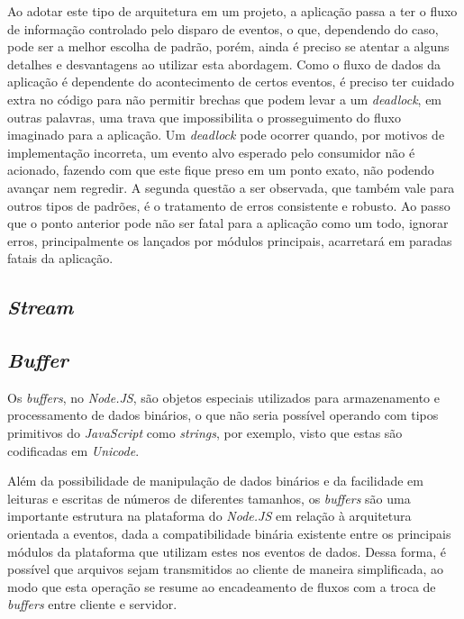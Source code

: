 \documentclass[12pt]{article}
\begin{document}
Ao adotar este tipo de arquitetura em um projeto, a aplicação passa a ter o fluxo de informação controlado pelo disparo
de eventos, o que, dependendo do caso, pode ser a melhor escolha de padrão, porém, ainda é preciso se atentar a alguns
detalhes e desvantagens ao utilizar esta abordagem. Como o fluxo de dados da aplicação é dependente do acontecimento
de certos eventos, é preciso ter cuidado extra no código para não permitir brechas que podem levar a um \textit{deadlock},
em outras palavras, uma trava que impossibilita o prosseguimento do fluxo imaginado para a aplicação. Um 
\textit{deadlock} pode ocorrer quando, por motivos de implementação incorreta, um evento alvo esperado pelo
consumidor não é acionado, fazendo com que este fique preso em um ponto exato, não podendo avançar nem regredir.
A segunda questão a ser observada, que também vale para outros tipos de padrões, é o tratamento de erros consistente
e robusto. Ao passo que o ponto anterior pode não ser fatal para a aplicação como um todo, ignorar erros, principalmente
os lançados por módulos principais, acarretará em paradas fatais da aplicação. \cite[p. 28]{DIOGORESENDE}


\subsection{\textit{Stream}}


\subsection{\textit{Buffer}}

Os \textit{buffers}, no \textit{Node.JS}, são objetos especiais utilizados para armazenamento e processamento 
de dados binários, o que não seria possível operando com tipos primitivos do \textit{JavaScript} como \textit{strings},
por exemplo, visto que estas são codificadas em \textit{Unicode}. \cite[p. 29]{DIOGORESENDE}

Além da possibilidade de manipulação de dados binários e da facilidade em leituras e escritas de números de diferentes 
tamanhos, os \textit{buffers} são uma importante estrutura na plataforma do \textit{Node.JS} em relação à arquitetura
orientada a eventos, dada a compatibilidade binária existente entre os principais módulos da plataforma que 
utilizam estes nos eventos de dados. Dessa forma, é possível que arquivos sejam transmitidos ao cliente de maneira 
simplificada, ao modo que esta operação se resume ao encadeamento de fluxos com a troca de 
\textit{buffers} entre cliente e servidor. \cite[p. 29]{DIOGORESENDE}
\end{document}
